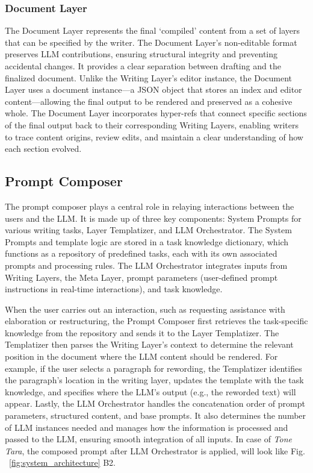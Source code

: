 \subsubsection{Document Layer} The Document Layer represents the final `compiled' content from a set of layers that can be specified by the writer. The Document Layer’s non-editable format preserves LLM contributions, ensuring structural integrity and preventing accidental changes. It provides a clear separation between drafting and the finalized document. Unlike the Writing Layer’s editor instance, the Document Layer uses a document instance—a JSON object that stores an index and editor content—allowing the final output to be rendered and preserved as a cohesive whole. The Document Layer incorporates hyper-refs that connect specific sections of the final output back to their corresponding Writing Layers, enabling writers to trace content origins, review edits, and maintain a clear understanding of how each section evolved.

\subsection{Prompt Composer}
The prompt composer  plays a central role in relaying interactions between the users and the LLM. It is made up of three key components: System Prompts for various writing tasks, Layer Templatizer, and LLM Orchestrator. The System Prompts and template logic are stored in a task knowledge dictionary, which functions as a repository of predefined tasks, each with its own associated prompts and processing rules. The LLM Orchestrator integrates inputs from Writing Layers, the Meta Layer, prompt parameters (user-defined prompt instructions in real-time interactions), and task knowledge. 

When the user carries out an interaction, such as requesting assistance with elaboration or restructuring, the Prompt Composer first retrieves the task-specific knowledge from the repository and sends it to the Layer Templatizer. The Templatizer then parses the Writing Layer’s context to determine the relevant position in the document where the LLM content should be rendered. For example, if the user selects a paragraph for rewording, the Templatizer identifies the paragraph's location in the writing layer, updates the template with the task knowledge, and specifies where the LLM's output (e.g., the reworded text) will appear. Lastly, the LLM Orchestrator handles the concatenation order of prompt parameters, structured content, and base prompts. It also determines the number of LLM instances needed and manages how the information is processed and passed to the LLM, ensuring smooth integration of all inputs. In case of \textit{Tone Tara}, the composed prompt after LLM Orchestrator is applied, will look like Fig. ~\ref{fig:system_architecture} B2.

